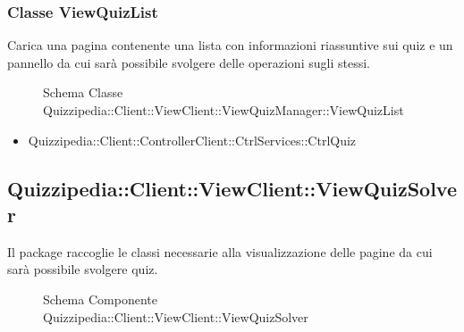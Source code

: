 \subsubsection{Classe ViewQuizList}
Carica una pagina contenente una lista con informazioni riassuntive sui quiz e un pannello da cui sarà possibile svolgere delle operazioni sugli stessi.
\begin{figure}[H]
\centering
\noindent{}
\caption{Schema Classe Quizzipedia::Client::ViewClient::ViewQuizManager::ViewQuizList}
\end{figure}
\begin{itemize}
\item Quizzipedia::Client::ControllerClient::CtrlServices::CtrlQuiz
\end{itemize}
\subsection{Quizzipedia::Client::ViewClient::ViewQuizSolver}
Il package raccoglie le classi necessarie alla visualizzazione delle pagine da cui sarà possibile svolgere quiz.
\begin{figure}[H]
\centering
\noindent{}
\caption[Quizzipedia::Client::ViewClient::ViewQuizSolver]{Schema Componente Quizzipedia::Client::ViewClient::ViewQuizSolver}
\end{figure}
